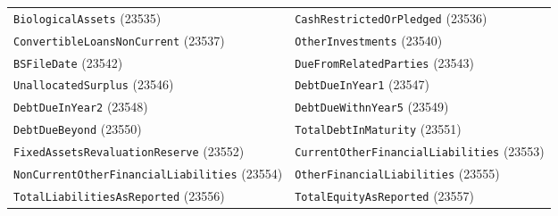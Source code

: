 \documentclass[11pt,a4paper]{report}
\begin{document}
\begin{subappendices}
{\begin{longtable}{@{}p{}p{}@{}}
\texttt{BiologicalAssets} (23535) & \texttt{CashRestrictedOrPledged} (23536) \\
\texttt{ConvertibleLoansNonCurrent} (23537) & \texttt{OtherInvestments} (23540) \\
\texttt{BSFileDate} (23542) & \texttt{DueFromRelatedParties} (23543) \\
\texttt{UnallocatedSurplus} (23546) & \texttt{DebtDueInYear1} (23547) \\
\texttt{DebtDueInYear2} (23548) & \texttt{DebtDueWithnYear5} (23549) \\
\texttt{DebtDueBeyond} (23550) & \texttt{TotalDebtInMaturity} (23551) \\
\texttt{FixedAssetsRevaluationReserve} (23552) & \texttt{CurrentOtherFinancialLiabilities} (23553) \\
\texttt{NonCurrentOtherFinancialLiabilities} (23554) & \texttt{OtherFinancialLiabilities} (23555) \\
\texttt{TotalLiabilitiesAsReported} (23556) & \texttt{TotalEquityAsReported} (23557) \\
\bottomrule
\end{longtable}}


\end{subappendices}
\end{document}
